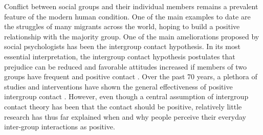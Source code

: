 \documentclass[man, 12pt, a4paper, mask]{apa7}
\theoremstyle{break}
\theoremstyle{plain}
\begin{document}
%
%
%

Conflict between social groups and their individual members remains a prevalent feature of the modern human condition. One of the main examples to date are the struggles of many migrants across the world, hoping to build a positive relationship with the majority group. One of the main ameliorations proposed by social psychologists has been the intergroup contact hypothesis. In its most essential interpretation, the intergroup contact hypothesis postulates that prejudice can be reduced and favorable attitudes increased if members of two groups have frequent and positive contact \citep[e.g.,][]{Allport1954b, Hewstone1996, Pettigrew1998}. Over the past 70 years, a plethora of studies and interventions have shown the general effectiveness of positive intergroup contact \citep[e.g.,][]{Pettigrew2006}. However, even though a central assumption of intergroup contact theory has been that the contact should be positive, relatively little research has thus far explained when and why people perceive their everyday inter-group interactions as positive. 
\end{document}
